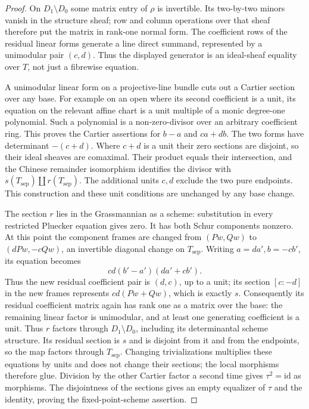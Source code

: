 \begin{proof}
On \(D_1\setminus D_0\) some matrix entry of \(\rho\) is
invertible.  Its two-by-two minors vanish in the structure sheaf;
row and column operations over that sheaf therefore put the matrix
in rank-one normal form.  The coefficient rows of the residual
linear forms generate a line direct summand, represented by a
unimodular pair \((c,d)\).  Thus the displayed generator is an
ideal-sheaf equality over \(T\), not just a fibrewise equation.

A unimodular linear form on a projective-line bundle cuts out a
Cartier section over any base.  For example on an open where its
second coefficient is a unit, its equation on the relevant affine
chart is a unit multiple of a monic degree-one polynomial.  Such a
polynomial is a non-zero-divisor over an arbitrary coefficient ring.
This proves the Cartier assertions for \(b-a\) and \(ca+db\).
The two forms have determinant \(-(c+d)\).  Where \(c+d\)
is a unit their zero sections are disjoint, so their ideal sheaves
are comaximal.  Their product equals their intersection, and the
Chinese remainder isomorphism identifies the divisor with
\(s(T_{\mathrm{sep}})\amalg r(T_{\mathrm{sep}})\).
The additional units \(c,d\) exclude the two pure endpoints.
This construction and these unit conditions are unchanged by any
base change.

The section \(r\) lies in the Grassmannian as a scheme: substitution
in every restricted Pluecker equation gives zero.  It has both Schur
components nonzero.  At this point the component frames are changed
from \((Pw,Qw)\) to \((dPw,-cQw)\), an invertible diagonal
change on \(T_{\mathrm{sep}}\).  Writing \(a=da',b=-cb'\), its equation becomes
\[ cd(b'-a')(da'+cb'). \]
Thus the new residual coefficient pair is \((d,c)\), up to a unit;
its section \([c:-d]\) in the new frames represents
\(cd(Pw+Qw)\), which is exactly \(s\).
Consequently its residual coefficient matrix again has rank one as
a matrix over the base: the remaining linear factor is unimodular,
and at least one generating coefficient is a unit.  Thus \(r\)
factors through \(D_1\setminus D_0\), including its determinantal
scheme structure.  Its residual section is \(s\) and is disjoint
from it and from the endpoints, so the map factors through
\(T_{\mathrm{sep}}\).  Changing trivializations multiplies
these equations by units and does not change their sections; the
local morphisms therefore glue.  Division by the other Cartier
factor a second time gives \(\tau^2=\mathrm{id}\) as morphisms.
The disjointness of the sections gives an empty equalizer of
\(\tau\) and the identity, proving the fixed-point-scheme assertion.
\end{proof}
